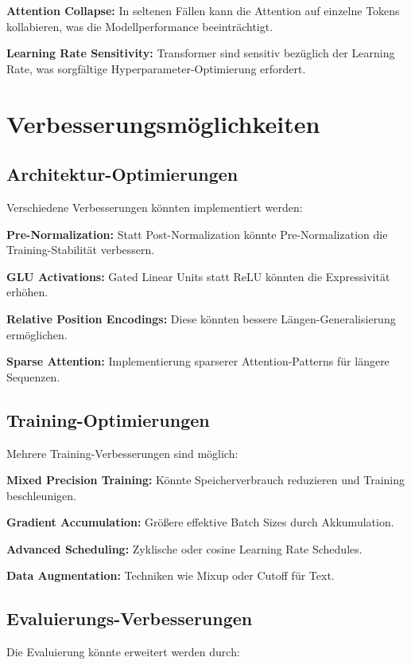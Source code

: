 \textbf{Attention Collapse:} In seltenen Fällen kann die Attention auf einzelne Tokens kollabieren, was die Modellperformance beeinträchtigt.

\textbf{Learning Rate Sensitivity:} Transformer sind sensitiv bezüglich der Learning Rate, was sorgfältige Hyperparameter-Optimierung erfordert.

\section{Verbesserungsmöglichkeiten}

\subsection{Architektur-Optimierungen}

Verschiedene Verbesserungen könnten implementiert werden:

\textbf{Pre-Normalization:} Statt Post-Normalization könnte Pre-Normalization die Training-Stabilität verbessern.

\textbf{GLU Activations:} Gated Linear Units statt ReLU könnten die Expressivität erhöhen.

\textbf{Relative Position Encodings:} Diese könnten bessere Längen-Generalisierung ermöglichen.

\textbf{Sparse Attention:} Implementierung sparserer Attention-Patterns für längere Sequenzen.

\subsection{Training-Optimierungen}

Mehrere Training-Verbesserungen sind möglich:

\textbf{Mixed Precision Training:} Könnte Speicherverbrauch reduzieren und Training beschleunigen.

\textbf{Gradient Accumulation:} Größere effektive Batch Sizes durch Akkumulation.

\textbf{Advanced Scheduling:} Zyklische oder cosine Learning Rate Schedules.

\textbf{Data Augmentation:} Techniken wie Mixup oder Cutoff für Text.

\subsection{Evaluierungs-Verbesserungen}

Die Evaluierung könnte erweitert werden durch:


